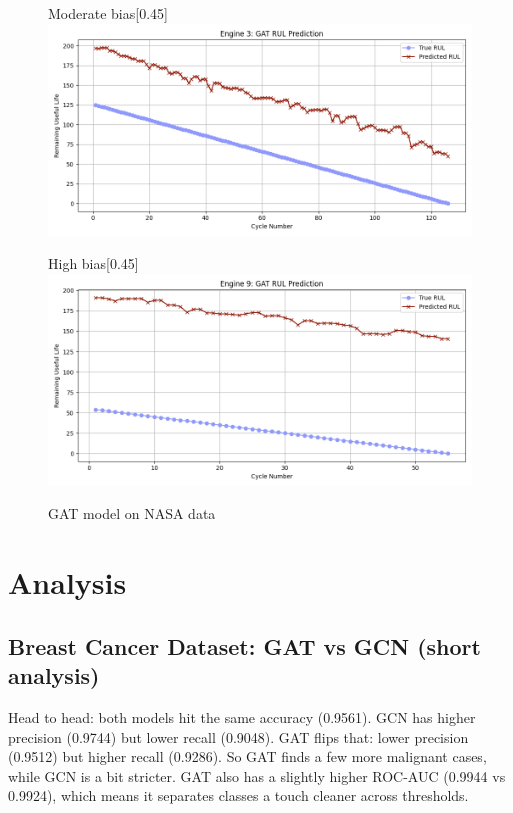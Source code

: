 \documentclass[12pt]{article}
\begin{document}
\begin{figure}[H]
    \begin{subcaptionbox}{Moderate bias\label{fig_NASA_GAT_eng2}}[0.45\textwidth]
        {\includegraphics[width=\linewidth]{figures/NASA/NASA_GAT_eng1.png}}
    \end{subcaptionbox}
    \hfill
    \begin{subcaptionbox}{High bias\label{fig_NASA_GAT_eng3}}[0.45\textwidth]
        {\includegraphics[width=\linewidth]{figures/NASA/NASA_GAT_eng3.png}}
    \end{subcaptionbox}

    \caption{GAT model on NASA data}
    \label{GAT_NASA_all}
\end{figure}


\pagebreak
\section{Analysis} \label{sec_analysis}

\subsection{Breast Cancer Dataset: GAT vs GCN (short analysis)}

Head to head: both models hit the same accuracy (0.9561). GCN has higher precision (0.9744) but lower recall (0.9048). GAT flips that: lower precision (0.9512) but higher recall (0.9286). So GAT finds a few more malignant cases, while GCN is a bit stricter. GAT also has a slightly higher ROC-AUC (0.9944 vs 0.9924), which means it separates classes a touch cleaner across thresholds.
\end{document}
